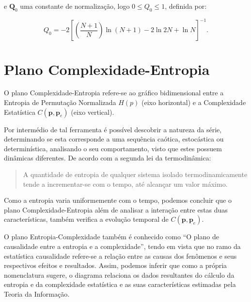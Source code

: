 e $\bm Q_0$ uma constante de normalização, logo $0 \leq Q_0 \leq 1$, definida por:

\begin{equation}
Q_0 = -2 \left[ \left(\frac{N + 1}{N} \right) \ln(N + 1) - 2 \ln{2N} + \ln{N} \right]^{-1}.
\end{equation}

\section{Plano Complexidade-Entropia}

 O plano Complexidade-Entropia refere-se ao gráfico bidimensional entre a Entropia de Permutação Normalizada $H(p)$ (eixo horizontal) e a Complexidade Estatística $C(\bm p, \bm p_e)$ (eixo vertical). 

 Por intermédio de tal ferramenta é possível descobrir a natureza da série, determinando se esta corresponde a uma sequência caótica, estocástica ou determinística, analisando o seu comportamento, visto que estes possuem dinâmicas diferentes. De acordo com a segunda lei da termodinâmica:
 
 \begin{quote}
A quantidade de entropia de qualquer sistema isolado termodinamicamente tende a incrementar-se com o tempo, até alcançar um valor máximo. 
 \end{quote}

 Como a entropia varia uniformemente com o tempo, podemos concluir que o plano Complexidade-Entropia além de analisar a interação entre estas duas características, também verifica a evolução temporal de $C(\bm p, \bm p_e)$.

 O plano Entropia-Complexidade também é conhecido como “O plano de causalidade entre a entropia e a complexidade”, tendo em vista que no ramo da estatística causalidade refere-se a relação entre as causas dos fenômenos e seus respectivos efeitos e resultados. Assim, podemos inferir que como a própria nomenclatura sugere, o diagrama relaciona os dados resultantes do cálculo da entropia e da complexidade estatística e as suas características estimadas pela Teoria da Informação. 


